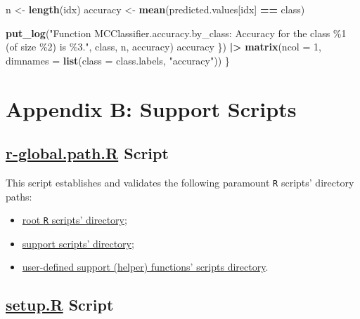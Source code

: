\documentclass[
]{report}
\newenvironment{Shaded}{\begin{snugshade}}{\end{snugshade}}
\newcommand{\AttributeTok}[1]{\textcolor[rgb]{0.13,0.29,0.53}{#1}}
\newcommand{\DecValTok}[1]{\textcolor[rgb]{0.00,0.00,0.81}{#1}}
\newcommand{\FunctionTok}[1]{\textcolor[rgb]{0.13,0.29,0.53}{\textbf{#1}}}
\newcommand{\NormalTok}[1]{#1}
\newcommand{\OtherTok}[1]{\textcolor[rgb]{0.56,0.35,0.01}{#1}}
\newcommand{\SpecialCharTok}[1]{\textcolor[rgb]{0.81,0.36,0.00}{\textbf{#1}}}
\newcommand{\StringTok}[1]{\textcolor[rgb]{0.31,0.60,0.02}{#1}}
\providecommand{\tightlist}{%
  \setlength{\itemsep}{0pt}\setlength{\parskip}{0pt}}
\begin{document}
\begin{Shaded}
\begin{Highlighting}[]
\NormalTok{    n }\OtherTok{\textless{}{-}} \FunctionTok{length}\NormalTok{(idx)}
\NormalTok{    accuracy }\OtherTok{\textless{}{-}} \FunctionTok{mean}\NormalTok{(predicted.values[idx] }\SpecialCharTok{==}\NormalTok{ class)}
    
    \FunctionTok{put\_log}\NormalTok{(}\StringTok{"Function \textasciigrave{}MCClassifier.accuracy.by\_class\textasciigrave{}:}
\StringTok{Accuracy for the class \textasciigrave{}\%1\textasciigrave{} (of size \%2) is \%3."}\NormalTok{,}
\NormalTok{            class, n, accuracy) }
\NormalTok{    accuracy}
\NormalTok{  \}) }\SpecialCharTok{|\textgreater{}} 
    \FunctionTok{matrix}\NormalTok{(}\AttributeTok{ncol =} \DecValTok{1}\NormalTok{, }\AttributeTok{dimnames =} \FunctionTok{list}\NormalTok{(}\AttributeTok{class =}\NormalTok{ class.labels, }\StringTok{"accuracy"}\NormalTok{)) }
\NormalTok{\}}
\end{Highlighting}
\end{Shaded}

\newpage

\chapter{Appendix B: Support Scripts}\label{appndx_b}

\section{\texorpdfstring{\href{https://github.com/AzKurban-edX-DS/edx.capstone.choose-your-own/blob/main/r-global.path.R}{r-global.path.R} Script}{r-global.path.R Script}}\label{appndx_b.r_global.path}

This script establishes and validates the following paramount \texttt{R} scripts' directory paths:

\begin{itemize}
\tightlist
\item
  \href{https://github.com/AzKurban-edX-DS/edx.capstone.choose-your-own/tree/main/r}{root \texttt{R} scripts' directory};
\item
  \href{https://github.com/AzKurban-edX-DS/edx.capstone.choose-your-own/tree/main/r/support-scripts}{support scripts' directory};
\item
  \href{https://github.com/AzKurban-edX-DS/edx.capstone.choose-your-own/tree/main/r/support-functions}{user-defined support (helper) functions' scripts directory}.
\end{itemize}

\section{\texorpdfstring{\href{https://github.com/AzKurban-edX-DS/edx.capstone.choose-your-own/blob/main/r/support-scripts/setup.R}{setup.R} Script}{setup.R Script}}\label{appndx_b.setup}
\end{document}
